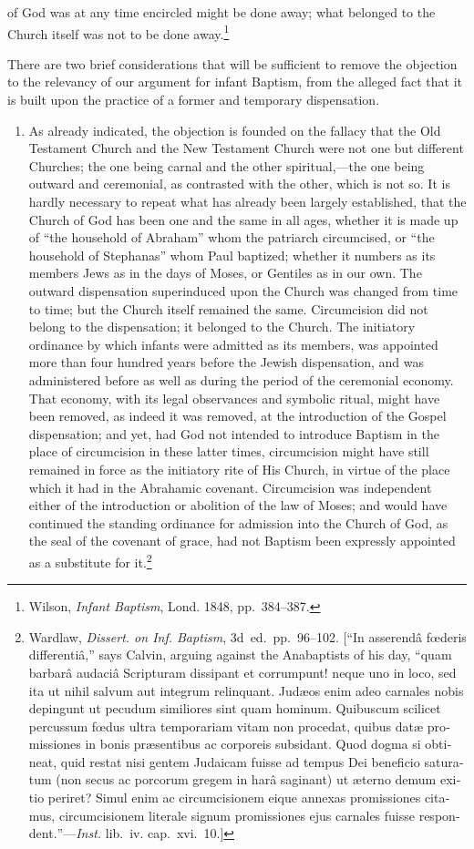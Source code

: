 \documentclass[
]{book}
\providecommand{\tightlist}{%
  \setlength{\itemsep}{0pt}\setlength{\parskip}{0pt}}
\begin{document}
of God was at any time encircled might be done away; what belonged to the Church itself was not to be done away.\footnote{Wilson, \emph{Infant Baptism}, Lond. 1848, pp.~384--387.}

There are two brief considerations that will be sufficient to remove the objection to the relevancy of our argument for infant Baptism, from the alleged fact that it is built upon the practice of a former and temporary dispensation.

\begin{enumerate}
\def\labelenumi{\arabic{enumi}.}
\tightlist
\item
  As already indicated, the objection is founded on the fallacy that the Old Testament Church and the New Testament Church were not one but different Churches; the one being carnal and the other spiritual,---the one being outward and ceremonial, as contrasted with the other, which is not so. It is hardly necessary to repeat what has already been largely established, that the Church of God has been one and the same in all ages, whether it is made up of ``the household of Abraham'' whom the patriarch circumcised, or ``the household of Stephanas'' whom Paul baptized; whether it numbers as its members Jews as in the days of Moses, or Gentiles as in our own. The outward dispensation superinduced upon the Church was changed from time to time; but the Church itself remained the same. Circumcision did not belong to the dispensation; it belonged to the Church. The initiatory ordinance by which infants were admitted as its members, was appointed more than four hundred years before the Jewish dispensation, and was administered before as well as during the period of the ceremonial economy. That economy, with its legal observances and symbolic ritual, might have been removed, as indeed it was removed, at the introduction of the Gospel dispensation; and yet, had God not intended to introduce Baptism in the place of circumcision in these latter times, circumcision might have still remained in force as the initiatory rite of His Church, in virtue of the place which it had in the Abrahamic covenant. Circumcision was independent either of the introduction or abolition of the law of Moses; and would have continued the standing ordinance for admission into the Church of God, as the seal of the covenant of grace, had not Baptism been expressly appointed as a substitute for it.\footnote{Wardlaw, \emph{Dissert. on Inf. Baptism}, 3d~ed.~pp.~96--102. {[}``\foreignlanguage{latin}{In asserendâ fœderis differentiâ},'' says Calvin, arguing against the Anabaptists of his day, ``\foreignlanguage{latin}{quam barbarâ audaciâ Scripturam dissipant et corrumpunt! neque uno in loco, sed ita ut nihil salvum aut integrum relinquant. Judæos enim adeo carnales nobis depingunt ut pecudum similiores sint quam hominum. Quibuscum scilicet percussum fœdus ultra temporariam vitam non procedat, quibus datæ promissiones in bonis præsentibus ac corporeis subsidant. Quod dogma si obtineat, quid restat nisi gentem Judaicam fuisse ad tempus Dei beneficio saturatum (non secus ac porcorum gregem in harâ saginant) ut æterno demum exitio periret? Simul enim ac circumcisionem eique annexas promissiones citamus, circumcisionem literale signum promissiones ejus carnales fuisse respondent.}''---\emph{Inst.} lib.~iv. cap.~xvi.~10.{]}}

\end{enumerate}
\end{document}
